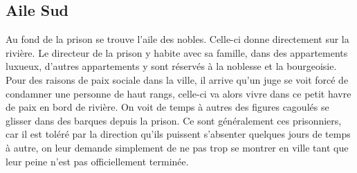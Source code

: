 \subsection{Aile Sud}

Au fond de la prison se trouve l'aile des nobles. Celle-ci donne 
directement sur la rivière. Le directeur de la prison y habite avec sa 
famille, dans des appartements luxueux, d'autres appartements y sont 
réservés à la noblesse et la bourgeoisie. Pour des raisons de paix 
sociale dans la ville, il arrive qu'un juge se voit forcé de condamner une personne
de haut rangs, celle-ci va alors vivre dans ce petit havre de paix en bord
de rivière. On voit 
de temps à autres des figures cagoulés se glisser dans 
des barques depuis la prison. Ce sont généralement ces prisonniers, car il est 
toléré par la direction qu'ils puissent s'absenter quelques jours de temps 
à autre, on leur demande simplement de ne pas trop se montrer en ville 
tant que leur peine n'est pas officiellement terminée.

